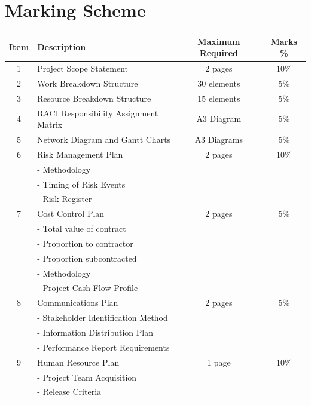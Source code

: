 \section*{Marking Scheme}
\begin{table}[ht]
	\centering
	\begin{tabular}{|c|l|c|c|}
		\hline
		\textbf{Item} & \textbf{Description} & \textbf{Maximum Required} & \textbf{Marks \%} \\
		\hline
		\hline

		1  & Project Scope Statement &  2 pages  & 10\% \\
		\hline

		2  & Work Breakdown Structure &  30 elements  & 5\% \\
		\hline

		3  & Resource Breakdown Structure &  15 elements  & 5\% \\
		\hline

		4  & RACI Responsibility Assignment Matrix &  A3 Diagram  & 5\% \\
		\hline

		5  & Network Diagram and Gantt Charts &  A3 Diagrams  & 5\% \\
		\hline

		6  & Risk Management Plan & 2 pages  & 10\% \\
   			&	- Methodology  & & \\
   			&	- Timing of Risk Events  & & \\
   			&	- Risk Register  & & \\
		\hline
		
		7  & Cost Control Plan &  2 pages  & 5\% \\
   			&	- Total value of contract  & & \\
   			&	- Proportion to contractor  & & \\
   			&	- Proportion subcontracted   & & \\
   			&	- Methodology  & & \\
   			&	- Project Cash Flow Profile  & & \\
		\hline

		8  & Communications Plan &  2 pages  & 5\% \\
   			&	- Stakeholder Identification Method  & & \\
   			&	- Information Distribution Plan  & & \\
   			&	- Performance Report Requirements  & & \\
		\hline

		9  & Human Resource Plan &  1 page  & 10\% \\
   			&	- Project Team Acquisition  & & \\
   			&	- Release Criteria  & & \\
		\hline


\end{tabular}
\end{table}
